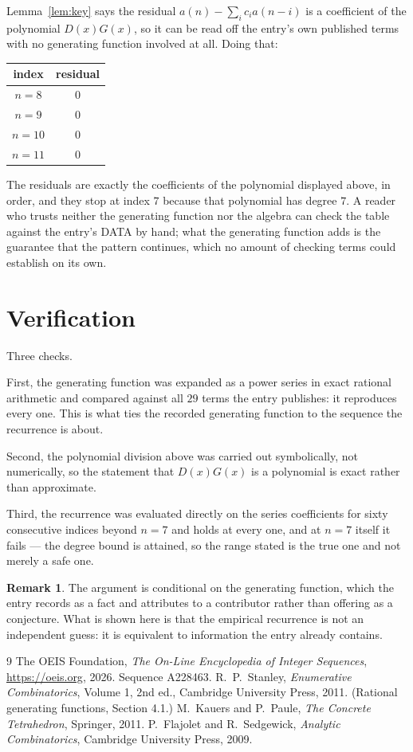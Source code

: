 \documentclass[11pt,a4paper]{article}
\theoremstyle{plain}
\theoremstyle{definition}
\newtheorem{remark}[theorem]{Remark}
\begin{document}
Lemma~\ref{lem:key} says the residual $a(n)-\sum_ic_ia(n-i)$ is a coefficient of the
polynomial $D(x)G(x)$, so it can be read off the entry's own published terms with no
generating function involved at all. Doing that:
\begin{center}
\begin{tabular}{cc}
index & residual \\ \hline
$n=8$ & $0$ \\
$n=9$ & $0$ \\
$n=10$ & $0$ \\
$n=11$ & $0$
\end{tabular}
\end{center}
The residuals are exactly the coefficients of the polynomial displayed above, in order, and
they stop at index $7$ because that polynomial has degree $7$. A reader who trusts
neither the generating function nor the algebra can check the table against the entry's DATA
by hand; what the generating function adds is the guarantee that the pattern continues, which
no amount of checking terms could establish on its own.

\section{Verification}

Three checks.

First, the generating function was expanded as a power series in exact rational arithmetic and
compared against all $29$ terms the entry publishes: it reproduces every one. This is
what ties the recorded generating function to the sequence the recurrence is about.

Second, the polynomial division above was carried out symbolically, not numerically, so the
statement that $D(x)G(x)$ is a polynomial is exact rather than approximate.

Third, the recurrence was evaluated directly on the series coefficients for sixty consecutive
indices beyond $n=7$ and holds at every one, and at $n=7$ itself it fails --- the
degree bound is attained, so the range stated is the true one and not merely a safe one.

\begin{remark}
The argument is conditional on the generating function, which the entry records as a fact and
attributes to a contributor rather than offering as a conjecture. What is shown here is that
the empirical recurrence is not an independent guess: it is equivalent to information the
entry already contains.
\end{remark}

\begin{thebibliography}{9}
 The OEIS Foundation, \emph{The On-Line Encyclopedia of Integer
Sequences}, \url{https://oeis.org}, 2026. Sequence A228463.
 R.~P.~Stanley, \emph{Enumerative Combinatorics}, Volume 1, 2nd ed.,
Cambridge University Press, 2011. (Rational generating functions, Section 4.1.)
 M.~Kauers and P.~Paule, \emph{The Concrete Tetrahedron}, Springer, 2011.
 P.~Flajolet and R.~Sedgewick, \emph{Analytic Combinatorics}, Cambridge
University Press, 2009.
\end{thebibliography}
\end{document}

